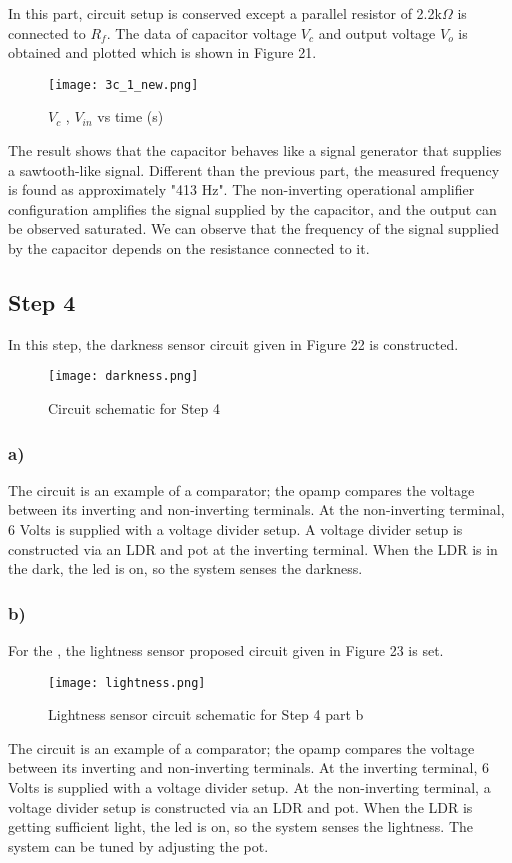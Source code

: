 \documentclass[letterpaper,12pt]{article}
\begin{document}
In this part, circuit setup is conserved except a parallel resistor of 2.2k\(\Omega\) is connected to \(R_f\). 
The data of capacitor voltage \(V_c\) and output voltage \(V_o\) is obtained and plotted which is shown in Figure 21. 
\begin{figure}[H]
	\centering
   \texttt{[image: 3c\_1\_new.png]}
   \caption{\(V_{c}\) , \(V_{in}\) vs time (s) }
\end{figure}
The result shows that the capacitor behaves like a signal generator that supplies a sawtooth-like signal. Different than the previous part, the measured frequency is found as approximately "413 Hz". The non-inverting operational amplifier configuration amplifies the signal supplied by the capacitor, and the output can be observed saturated. We can observe that the frequency of the signal supplied by the capacitor depends on the resistance connected to it. 

\subsection{Step 4}
In this step, the darkness sensor circuit given in Figure 22 is constructed.
\begin{figure}[H]
	\centering
   \texttt{[image: darkness.png]}
   \caption{Circuit schematic for Step 4}
\end{figure}
\subsubsection{a)}
The circuit is an example of a comparator; the opamp compares the voltage between its inverting and non-inverting terminals. At the non-inverting terminal, 6 Volts is supplied with a voltage divider setup. A voltage divider setup is constructed via an LDR and pot at the inverting terminal. When the LDR is in the dark, the led is on, so the system senses the darkness.
\subsubsection{b)}
For the , the lightness sensor proposed circuit given in Figure 23 is set. 
\begin{figure}[H]
	\centering
   \texttt{[image: lightness.png]}
   \caption{Lightness sensor circuit schematic for Step 4 part b}
\end{figure}
The circuit is an example of a comparator; the opamp compares the voltage between its inverting and non-inverting terminals. At the inverting terminal, 6 Volts is supplied with a voltage divider setup. At the non-inverting terminal, a voltage divider setup is constructed via an LDR and pot. When the LDR is getting sufficient light, the led is on, so the system senses the lightness. The system can be tuned by adjusting the pot.
\end{document}
